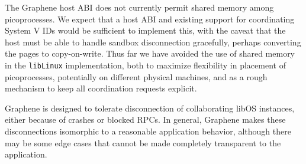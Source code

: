 \vspace{5pt}
 The Graphene host ABI 
does not currently permit shared memory among picoprocesses.
We expect that a host ABI and existing support for coordinating System V IDs would be sufficient to implement this,
with the caveat that the host must be able to handle sandbox disconnection gracefully, perhaps converting the pages to copy-on-write.
Thus far we have avoided the use of shared memory in the {\tt libLinux} implementation, both to maximize flexibility in placement of picoprocesses, potentially on different physical machines,
and as a rough mechanism to keep all coordination requests explicit.



 
\begin{comment}
\paragraph{Limitations.} At the time of submission,
Graphene does not recover from all cases where a leader picoprocess crashes.
Our current prototype requires the IPC helper thread in the leader to remain 
in the sandbox and respond to messages even if its process {\tt main} routine has completed,
and the evaluation data reflects this state.
\end{comment}

\vspace{5pt}
Graphene is designed to tolerate disconnection of collaborating libOS instances,
either because of crashes or blocked RPCs.  In general, Graphene makes 
these disconnections isomorphic to a reasonable application behavior,
although there may be some edge cases that cannot be made completely transparent to the application.

